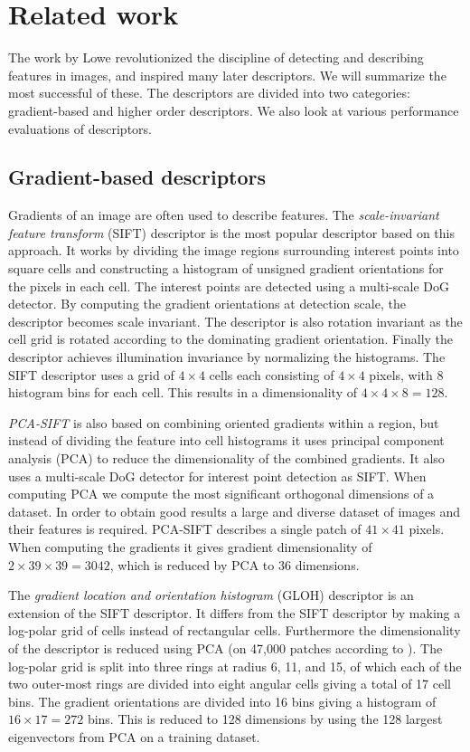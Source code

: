 \documentclass[../thesis.tex]{subfiles}
\begin{document}
\section{Related work}

The work by Lowe \cite{lowe2004distinctive} revolutionized the discipline
of detecting and describing features in images, and inspired many later
descriptors. We will summarize the most successful of these. The descriptors
are divided into two categories: gradient-based and higher order descriptors.
We also look at various performance evaluations of descriptors.

\subsection{Gradient-based descriptors}
Gradients of an image are often used to describe features.
The \emph{scale-invariant feature transform} (SIFT) descriptor
\cite{lowe2004distinctive} is the most popular descriptor based on this
approach. It works by dividing the image regions surrounding interest
points into square cells and constructing a histogram of unsigned gradient
orientations for the pixels in each cell. The interest points are detected
using a multi-scale DoG detector. By computing the gradient orientations
at detection scale, the descriptor becomes scale invariant. The descriptor
is also rotation invariant as the cell grid is rotated according to the
dominating gradient orientation. Finally the descriptor achieves illumination
invariance by normalizing the histograms. The SIFT descriptor uses a grid of
$4 \times 4$ cells each consisting of $4 \times 4$ pixels, with 8 histogram
bins for each cell. This results in a dimensionality of $4 \times 4 \times 8 =
128$.

\emph{PCA-SIFT} \cite{ke2004pca} is also based on combining oriented gradients
within a region, but instead of dividing the feature into cell histograms
it uses principal component analysis (PCA) to reduce the dimensionality
of the combined gradients. It also uses a multi-scale DoG detector for
interest point detection as SIFT. When computing PCA we compute the most
significant orthogonal dimensions of a dataset. In order to obtain good
results a large and diverse dataset of images and their features is required.
PCA-SIFT describes a single patch of $41 \times 41$ pixels. When computing
the gradients it gives gradient dimensionality of $2\times39\times39 = 3042$,
which is reduced by PCA to 36 dimensions.

The \emph{gradient location and orientation histogram} (GLOH) descriptor
\cite{mikolajczyk2005performance} is an extension of the SIFT descriptor.
It differs from the SIFT descriptor by making a log-polar grid of
cells instead of rectangular cells. Furthermore the dimensionality of
the descriptor is reduced using PCA (on 47,000 patches according to
\cite{mikolajczyk2005performance}). The log-polar grid is split into three
rings at radius 6, 11, and 15, of which each of the two outer-most rings are
divided into eight angular cells giving a total of 17 cell bins. The gradient
orientations are divided into 16 bins giving a histogram of $16 \times 17
= 272$ bins. This is reduced to 128 dimensions by using the 128 largest
eigenvectors from PCA on a training dataset.
\end{document}
